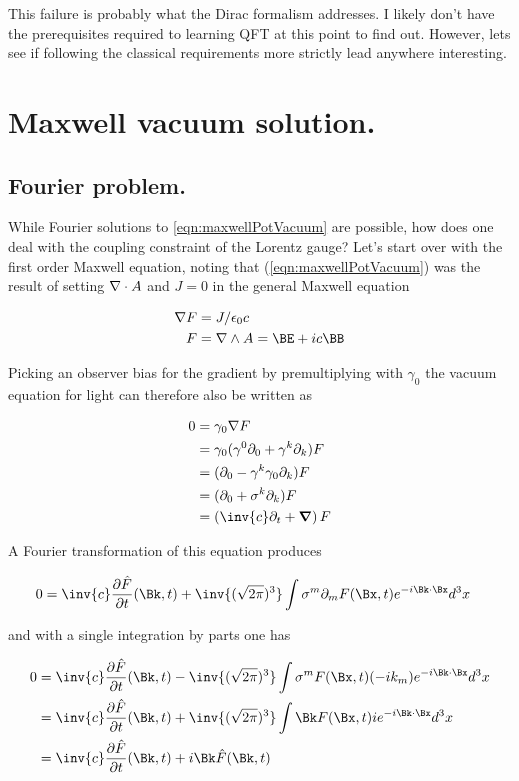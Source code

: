 This failure is probably what the Dirac formalism addresses.  I likely don't have the prerequisites required to learning QFT at this point to find out.  However, lets see if following the classical requirements more strictly lead anywhere interesting.

\section{Maxwell vacuum solution.}

\subsection{Fourier problem.}
While Fourier solutions to \ref{eqn:maxwellPotVacuum} are possible, how does one deal with the coupling constraint of the Lorentz gauge?  Let's start
over with the first order Maxwell equation, noting that (\ref{eqn:maxwellPotVacuum}) was the result of setting $\nabla \cdot A$ and $J = 0$ in the
general Maxwell equation

\begin{align}\label{eqn:maxwell}
\grad F &= J/\epsilon_0 c \\
F &= \grad \wedge A = \BE + i c \BB
\end{align}

Picking an observer bias for the gradient by premultiplying with $\gamma_0$ the vacuum equation for light can therefore also be written as

\begin{align*}
0
&= \gamma_0 \grad F \\
&= \gamma_0 (\gamma^0 \partial_0 + \gamma^k \partial_k) F \\
&= (\partial_0 - \gamma^k \gamma_0 \partial_k) F \\
&= (\partial_0 + \sigma^k \partial_k) F \\
&= \left(\inv{c}\partial_t + \spacegrad \right) F \\
\end{align*}

A Fourier transformation of this equation produces

\begin{align*}
0 &= \inv{c} \PD{t}{\hat{F}}(\Bk,t) + \inv{(\sqrt{2\pi})^3} \int \sigma^m \partial_m F(\Bx,t) e^{-i \Bk \cdot \Bx} d^3 x
\end{align*}

and with a single integration by parts one has

\begin{align*}
0
&= \inv{c} \PD{t}{\hat{F}}(\Bk,t) - \inv{(\sqrt{2\pi})^3} \int \sigma^m F(\Bx,t) (-i k_m) e^{-i \Bk \cdot \Bx} d^3 x \\
&= \inv{c} \PD{t}{\hat{F}}(\Bk,t) + \inv{(\sqrt{2\pi})^3} \int \Bk F(\Bx,t) i e^{-i \Bk \cdot \Bx} d^3 x \\
&= \inv{c} \PD{t}{\hat{F}}(\Bk,t) + i \Bk \hat{F}(\Bk,t)
\end{align*}


